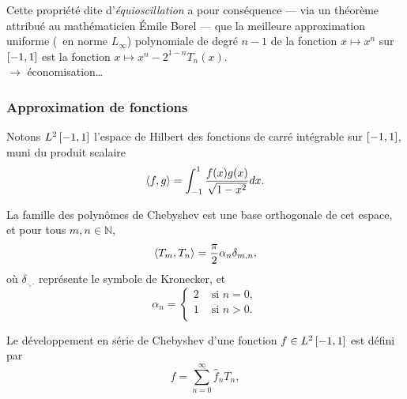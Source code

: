 Cette propriété dite d'\emph{équioscillation} a pour conséquence --- via un théorème attribué au mathématicien Émile Borel --- que la meilleure approximation uniforme (\ie\ en norme $L_\infty$) polynomiale de degré $n - 1$ de la fonction $x \mapsto x^n$ sur $\left[ -1, 1 \right]$ est la fonction $x \mapsto x^n - 2^{1 - n} T_n(x)$. \\
$\to$ économisation\ldots


\subsubsection{Approximation de fonctions}
Notons $L^2\left[ -1, 1 \right]$ l'espace de Hilbert des fonctions de carré intégrable sur $\left[ -1, 1 \right]$, muni du produit scalaire
\begin{equation}
	\left \langle {f}, {g} \right \rangle =
	\int_{-1}^{1} \frac{f(x) g(x)}{\sqrt{1 - x^2}} dx.
	\label{eq:chebyshev_scalar_product}
\end{equation}

La famille des polynômes de Chebyshev est une base orthogonale de cet espace, et pour tous $m,n \in \mathbb{N}$,
\begin{equation}
	\left \langle {T_m}, {T_n} \right \rangle =
	\frac{\pi}{2} \alpha_n \delta_{m,n},
	\label{eq:chebyshev_orthogonality}
\end{equation}
où $\delta_{\cdot,\cdot}$ représente le symbole de Kronecker, et
\begin{equation}
	\alpha_n = 
	\begin{cases}
	 2 & \text{\ si\ } n = 0,   \\ 
	 1 & \text{\ si\ } n > 0.\\ 
	\end{cases}
\end{equation}

Le développement en série de Chebyshev d'une fonction $f \in L^2\left[ -1, 1 \right]$ est défini par
\begin{equation}
	f = \sum_{n=0}^{\infty} \hat{f}_n T_n,
	\label{eq:chebyshev_series}
\end{equation}

